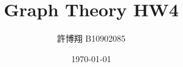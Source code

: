 \setlength{\parindent}{0pt}

\title{Graph Theory HW4}
\author{許博翔 B10902085}
\date{\today}
\maketitle
\thispagestyle{empty}
\setcounter{page}{1}
\pagestyle{fancy}

\renewcommand{\sectionmark}[1]{\markright{#1}}
\renewcommand{\subsectionmark}[1]{}

\lhead{\thetitle}
\chead{}
\rhead{}
\cfoot{}
\rfoot{\thepage}
\renewcommand{\headrulewidth}{0.4pt}
\renewcommand{\footrulewidth}{0.4pt}





\newpage
